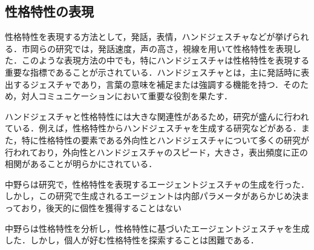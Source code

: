 \subsection{性格特性の表現}
\label{sec2.3.3}
性格特性を表現する方法として，発話，表情，ハンドジェスチャなどが挙げられる．市岡らの研究では，発話速度，声の高さ，視線を用いて性格特性を表現した\cite{対人親和性}．このような表現方法の中でも，特にハンドジェスチャは性格特性を表現する重要な指標であることが示されている\cite{ハンドジェスチャ指標1}\cite{ハンドジェスチャ指標2}\cite{ハンドジェスチャ指標3}．ハンドジェスチャとは，主に発話時に表出するジェスチャであり，言葉の意味を補足または強調する機能を持つ\cite{ハンドジェスチャ強調}．そのため，対人コミュニケーションにおいて重要な役割を果たす．

ハンドジェスチャと性格特性には大きな関連性があるため，研究が盛んに行われている．例えば，性格特性からハンドジェスチャを生成する研究などがある\cite{ジェスチャ生成}．また，特に性格特性の要素である外向性とハンドジェスチャについて多くの研究が行われており，外向性とハンドジェスチャのスピード，大きさ，表出頻度に正の相関があることが明らかにされている\cite{ハンドジェスチャ指標1}\cite{ハンドジェスチャ指標3}\cite{ハンドジェスチャ外向性}．

中野らは研究で，性格特性を表現するエージェントジェスチャの生成を行った．しかし，この研究で生成されるエージェントは内部パラメータがあらかじめ決まっており，後天的に個性を獲得することはない

中野らは性格特性を分析し，性格特性に基づいたエージェントジェスチャを生成した．しかし，個人が好む性格特性を探索することは困難である．




\vspace{1cm}
\begin{figure}[!h]
 \begin{center}
  \centering
  \label{fig:kansei}
 \end{center}
\end{figure}

